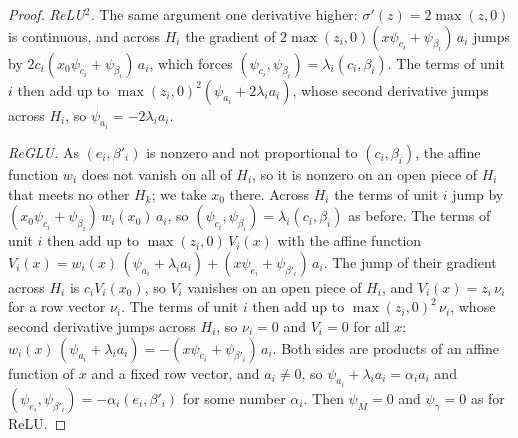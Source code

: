 \documentclass[10pt]{article}
\theoremstyle{definition}
\theoremstyle{remark}
\newenvironment{nested}{\par\nopagebreak\def\FrameCommand{\hspace{0.5em}{\color{black!30}\vrule width 0.6pt}\hspace{1em}}\MakeFramed{\advance\hsize-\width\FrameRestore}}{\endMakeFramed}
\begin{document}
\begin{nested}
\begin{proof}
\emph{ReLU$^2$.} The same argument one derivative higher: $\sigma'(z) = 2\max(z, 0)$ is continuous, and across $H_i$ the gradient of $2\max(z_i, 0)(x\psi_{c_i} + \psi_{\beta_i})\,a_i$ jumps by $2c_i(x_0\psi_{c_i} + \psi_{\beta_i})\,a_i$, which forces $(\psi_{c_i}, \psi_{\beta_i}) = \lambda_i(c_i, \beta_i)$. The terms of unit $i$ then add up to $\max(z_i, 0)^2(\psi_{a_i} + 2\lambda_ia_i)$, whose second derivative jumps across $H_i$, so $\psi_{a_i} = -2\lambda_ia_i$.

\emph{ReGLU.} As $(e_i, \beta'_i)$ is nonzero and not proportional to $(c_i, \beta_i)$, the affine function $w_i$ does not vanish on all of $H_i$, so it is nonzero on an open piece of $H_i$ that meets no other $H_k$; we take $x_0$ there. Across $H_i$ the terms of unit $i$ jump by $(x_0\psi_{c_i} + \psi_{\beta_i})\,w_i(x_0)\,a_i$, so $(\psi_{c_i}, \psi_{\beta_i}) = \lambda_i(c_i, \beta_i)$ as before. The terms of unit $i$ then add up to $\max(z_i, 0)\,V_i(x)$ with the affine function $V_i(x) = w_i(x)\,(\psi_{a_i} + \lambda_ia_i) + (x\psi_{e_i} + \psi_{\beta'_i})\,a_i$. The jump of their gradient across $H_i$ is $c_iV_i(x_0)$, so $V_i$ vanishes on an open piece of $H_i$, and $V_i(x) = z_i\,\nu_i$ for a row vector $\nu_i$. The terms of unit $i$ then add up to $\max(z_i, 0)^2\,\nu_i$, whose second derivative jumps across $H_i$, so $\nu_i = 0$ and $V_i = 0$ for all $x$: $w_i(x)\,(\psi_{a_i} + \lambda_ia_i) = -(x\psi_{e_i} + \psi_{\beta'_i})\,a_i$. Both sides are products of an affine function of $x$ and a fixed row vector, and $a_i \neq 0$, so $\psi_{a_i} + \lambda_ia_i = \alpha_ia_i$ and $(\psi_{e_i}, \psi_{\beta'_i}) = -\alpha_i(e_i, \beta'_i)$ for some number $\alpha_i$. Then $\psi_M = 0$ and $\psi_\gamma = 0$ as for ReLU.


\end{proof}
\end{nested}
\end{document}
